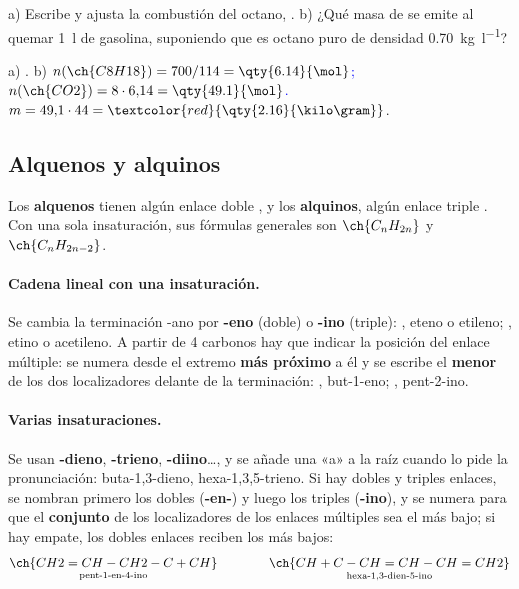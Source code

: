 \begin{exercise}
    a) Escribe y ajusta la combustión del octano, . b) ¿Qué masa de  se emite al quemar \qty{1}{\litre} de
    gasolina, suponiendo que es octano puro de densidad \qty{0.70}{\kilo\gram\per\litre}?
    \begin{solu}
        a) \textcolor{red}{}. b) \textcolor{blue}{\(n(\ch{C8H18}) = 700/114 = \qty{6.14}{\mol}\);
        \(n(\ch{CO2}) = 8 \cdot 6{,}14 = \qty{49.1}{\mol}\).} \(m = 49{,}1 \cdot 44 = \textcolor{red}{\qty{2.16}{\kilo\gram}}\).
    \end{solu}
\end{exercise}

\subsection{Alquenos y alquinos}

Los \textbf{alquenos} tienen algún enlace doble , y los \textbf{alquinos}, algún enlace triple . Con una sola
insaturación, sus fórmulas generales son \(\ch{C_nH_{2n}}\) y \(\ch{C_nH_{2n-2}}\).

\paragraph{Cadena lineal con una insaturación.} Se cambia la terminación -ano por \textbf{-eno} (doble) o \textbf{-ino} (triple):
, eteno o etileno; , etino o acetileno. A partir de 4 carbonos hay que indicar la posición del enlace
múltiple: se numera desde el extremo \textbf{más próximo} a él y se escribe el \textbf{menor} de los dos localizadores delante de la
terminación: , but-1-eno; , pent-2-ino.

\paragraph{Varias insaturaciones.} Se usan \textbf{-dieno}, \textbf{-trieno}, \textbf{-diino}\ldots, y se añade una «a» a la raíz
cuando lo pide la pronunciación: buta-1,3-dieno, hexa-1,3,5-trieno. Si hay dobles y triples enlaces, se nombran primero los
dobles (\textbf{-en-}) y luego los triples (\textbf{-ino}), y se numera para que el \textbf{conjunto} de los localizadores de los
enlaces múltiples sea el más bajo; si hay empate, los dobles enlaces reciben los más bajos:
\[ \underset{\text{pent-1-en-4-ino}}{\ch{CH2=CH-CH2-C+CH}} \qquad\qquad
   \underset{\text{hexa-1,3-dien-5-ino}}{\ch{CH+C-CH=CH-CH=CH2}} \]

